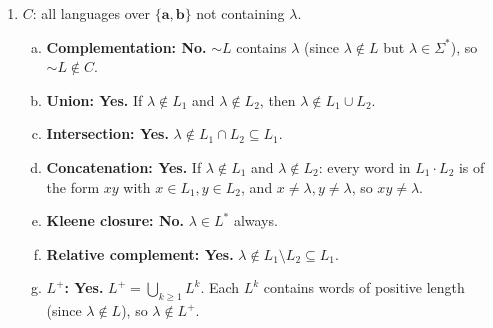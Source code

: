 \begin{enumerate}[{5.}1. ]
\begin{enumerate}[(a)]
  \item \textbf{$\pmb{E}$ closed under $I$?}  If $\pmb{abba}\in L$ and $|\pmb{abba}|=4$ is not prime, then $\pmb{abba}\notin I(L)$.  So $I(L)$ might not contain $\pmb{abba}$.  \textbf{Not closed.}

  \item \textbf{\NSIG\ closed under $I$?}  (If $\NSIG=\DSIG$: no, by (a).  If $\NSIG$ is CFLs: $I(L)$ for CFL $L$ need not be CFL.)
\end{enumerate}

\item $C$: all languages over $\{\pmb{a},\pmb{b}\}$ not containing $\lambda$.

\begin{enumerate}[(a)]
  \item \textbf{Complementation: No.}  $\sim L$ contains $\lambda$ (since $\lambda\notin L$ but $\lambda\in\Sigma^*$), so $\sim L\notin C$.

  \item \textbf{Union: Yes.}  If $\lambda\notin L_1$ and $\lambda\notin L_2$, then $\lambda\notin L_1\cup L_2$.

  \item \textbf{Intersection: Yes.}  $\lambda\notin L_1\cap L_2\subseteq L_1$.

  \item \textbf{Concatenation: Yes.}  If $\lambda\notin L_1$ and $\lambda\notin L_2$: every word in $L_1\cdot L_2$ is of the form $xy$ with $x\in L_1,y\in L_2$, and $x\neq\lambda,y\neq\lambda$, so $xy\neq\lambda$.

  \item \textbf{Kleene closure: No.}  $\lambda\in L^*$ always.

  \item \textbf{Relative complement: Yes.}  $\lambda\notin L_1\setminus L_2\subseteq L_1$.

  \item \textbf{$L^+$: Yes.}  $L^+=\bigcup_{k\ge 1}L^k$.  Each $L^k$ contains words of positive length (since $\lambda\notin L$), so $\lambda\notin L^+$.
\end{enumerate}


\end{enumerate}
